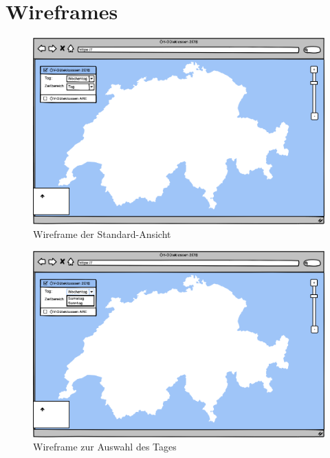 \chapter*{Wireframes}
\label{appendix:wireframes}

\begin{figure}[ht]
    \centering
    \includegraphics[width=0.8\linewidth]{projectdoc/img/wireframes/standardansicht.png}
    \caption[Wireframe der Standard-Ansicht]{Wireframe der Standard-Ansicht}
    \label{fig:wireframe_main_appendix}
\end{figure}

\begin{figure}[ht]
    \centering
    \includegraphics[width=0.8\linewidth]{projectdoc/img/wireframes/tag_auswahl.png}
    \caption[Wireframe zur Auswahl des Tages]{Wireframe zur Auswahl des Tages}
    \label{fig:wireframe_auswahl_tag}
\end{figure}

